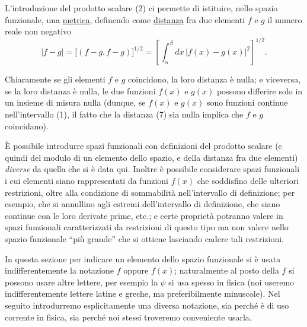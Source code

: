 \documentclass[11pt, a4paper]{book}
\numberwithin{equation}{section}
\begin{document}
L'introduzione del prodotto scalare (2) ci permette di istituire, nello
spazio funzionale, una \uline{metrica}, definendo come
\uline{distanza} fra due elementi $f$ e $g$ il numero reale non
negativo
\begin{equation}
|f-g| = \bigl[(f-g,f-g)\bigr]^{1/2}
= \left[\int_\alpha^\beta dx\,|f(x)-g(x)|^2\right]^{1/2}.
\end{equation}

Chiaramente se gli elementi $f$ e $g$ coincidono, la loro distanza è
nulla; e viceversa, se la loro distanza è nulla, le due funzioni $f(x)$
e $g(x)$ possono differire solo in un insieme di misura nulla (dunque,
se $f(x)$ e $g(x)$ sono funzioni continue nell'intervallo (1), il fatto
che la distanza (7) sia nulla implica che $f$ e $g$ coincidano).

È possibile introdurre spazi funzionali con definizioni del prodotto
scalare (e quindi del modulo di un elemento dello spazio, e della
distanza fra due elementi) \emph{diverse} da quella che si è data qui.
Inoltre è possibile considerare spazi funzionali i cui elementi siano
rappresentati da funzioni $f(x)$ che soddisfino delle ulteriori
restrizioni, oltre alla condizione di sommabilità nell'intervallo di
definizione; per esempio, che si annullino agli estremi dell'intervallo
di definizione, che siano continue con le loro derivate prime, etc.; e
certe proprietà potranno valere in spazi funzionali caratterizzati da
restrizioni di questo tipo ma non valere nello spazio funzionale ``più
grande'' che si ottiene lasciando cadere tali restrizioni.

In questa sezione per indicare un elemento dello spazio funzionale si
è usata indifferentemente la notazione $f$ oppure $f(x)$; naturalmente
al posto della $f$ si possono usare altre lettere, per esempio la $\psi$
si usa spesso in fisica (noi useremo indifferentemente lettere latine e
greche, ma preferibilmente minuscole). Nel seguito introdurremo
esplicitamente una diversa notazione, sia perché è di uso corrente in
fisica, sia perché noi stessi troveremo conveniente usarla.
\end{document}
